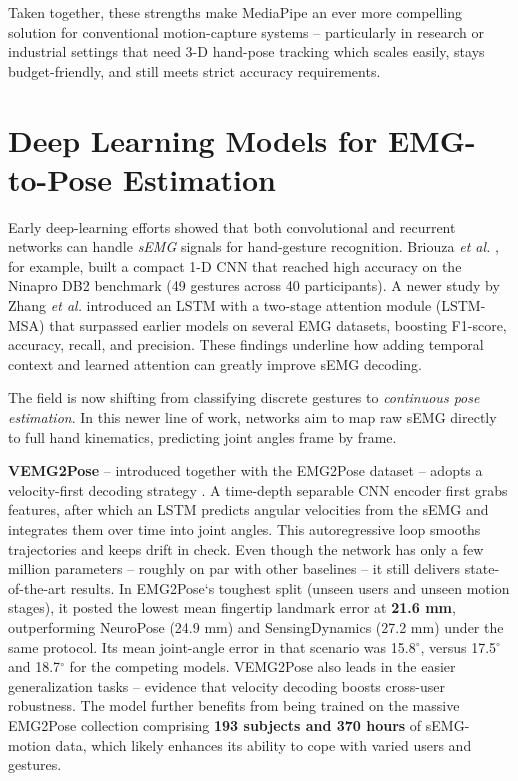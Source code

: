 Taken together, these strengths make MediaPipe an ever more compelling solution for conventional motion-capture systems -- particularly in research or industrial settings that need 3-D hand-pose tracking which scales easily, stays budget-friendly, and still meets strict accuracy requirements.

\section{Deep Learning Models for EMG-to-Pose Estimation}

Early deep-learning efforts showed that both convolutional and recurrent networks can handle \textit{sEMG} signals for hand-gesture recognition. Briouza \textit{et al.} \cite{briouza2021convolutional}, for example, built a compact 1-D CNN that reached high accuracy on the Ninapro DB2 benchmark (49 gestures across 40 participants). A newer study by Zhang \textit{et al.} \cite{zhang2023lstm} introduced an LSTM with a two-stage attention module (LSTM-MSA) that surpassed earlier models on several EMG datasets, boosting F1-score, accuracy, recall, and precision. These findings underline how adding temporal context and learned attention can greatly improve sEMG decoding.

The field is now shifting from classifying discrete gestures to \textit{continuous pose estimation}. In this newer line of work, networks aim to map raw sEMG directly to full hand kinematics, predicting joint angles frame by frame.

\textbf{VEMG2Pose} -- introduced together with the EMG2Pose dataset -- adopts a velocity-first decoding strategy \cite{salter2024emg2pose}. A time-depth separable CNN encoder first grabs features, after which an LSTM predicts angular velocities from the sEMG and integrates them over time into joint angles. This autoregressive loop smooths trajectories and keeps drift in check. Even though the network has only a few million parameters -- roughly on par with other baselines -- it still delivers state-of-the-art results. In EMG2Pose`s toughest split (unseen users and unseen motion stages), it posted the lowest mean fingertip landmark error at \textbf{21.6  mm}, outperforming NeuroPose (24.9  mm) and SensingDynamics (27.2  mm) under the same protocol. Its mean joint-angle error in that scenario was 15.8$^\circ$, versus 17.5$^\circ$ and 18.7$^\circ$ for the competing models. VEMG2Pose also leads in the easier generalization tasks -- evidence that velocity decoding boosts cross-user robustness. The model further benefits from being trained on the massive EMG2Pose collection comprising \textbf{193 subjects and 370 hours} of sEMG-motion data, which likely enhances its ability to cope with varied users and gestures.

